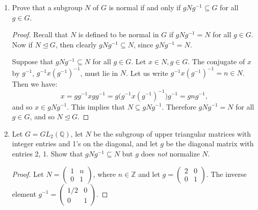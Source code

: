 \documentclass{article}
\begin{document}
\begin{enumerate}[label=(\alph*), itemsep=0em]
    \item Prove that a subgroup $N$ of $G$ is normal if and only if $gNg^{-1} \subseteq G$ for all $g \in G$.
          \begin{proof}
            Recall that $N$ is defined to be normal in $G$ if $gNg^{-1} = N$ for all $g \in G$. Now if $N \unlhd G$, then clearly $gNg^{-1} \subseteq N$, since $gNg^{-1} = N$.

            Suppose that $gNg^{-1} \subseteq N$ for all $g \in G$. Let $x \in N, g \in G$. The conjugate of $x$ by $g^{-1}$, $g^{-1}x(g^{-1})^{-1}$, must lie in $N$. Let us write $g^{-1}x(g^{-1})^{-1} = n \in N$. Then we have:
            \begin{equation*}
                x = gg^{-1}xgg^{-1} = g\bigl(g^{-1}x(g^{-1})^{-1}\bigr)g^{-1} = gng^{-1},
            \end{equation*}
            and so $x \in gNg^{-1}$. This implies that $N \subseteq gNg^{-1}$. Therefore $gNg^{-1} = N$ for all $g \in G$, and so $N \unlhd G$.
          \end{proof}
    \item Let $G = GL_2(\mathbb{Q})$, let $N$ be the subgroup of upper triangular matrices with integer entries and 1's on the diagonal, and let $g$ be the diagonal matrix with entries 2, 1. Show that $gNg^{-1} \subseteq N$ but $g$ does \emph{not} normalize $N$.
          \begin{proof}
            Let $N = \begin{pmatrix}1 & n \\ 0 & 1\end{pmatrix}$, where $n \in \mathbb{Z}$ and let $g = \begin{pmatrix}2 & 0 \\ 0 & 1\end{pmatrix}$. The inverse element $g^{-1} = \begin{pmatrix}1/2 & 0 \\ 0 & 1\end{pmatrix}$.


\end{proof}
\end{enumerate}
\end{document}
